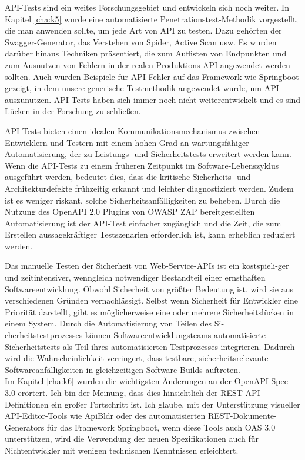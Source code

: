 API-Tests sind ein weites Forschungsgebiet und entwickeln sich noch weiter. In Kapitel \ref{cha:k5} wurde eine automatisierte Penetrationstest-Methodik vorgestellt, die man anwenden sollte, um jede Art von API zu testen. Dazu gehörten der Swagger-Generator, das Verstehen von Spider, Active Scan usw. Es wurden darüber hinaus Techniken präsentiert, die zum Auflisten von Endpunkten und zum Ausnutzen von Fehlern in der realen Produktions-API angewendet werden sollten. Auch wurden Beispiele für API-Fehler auf das Framework wie Springboot gezeigt, in dem unsere generische Testmethodik angewendet wurde, um API auszunutzen. API-Tests haben sich immer noch nicht weiterentwickelt und es sind Lücken in der Forschung zu schließen.

API-Tests bieten einen idealen Kommunikationsmechanismus zwischen Entwicklern und Testern mit einem hohen Grad an wartungsfähiger Automatisierung, der zu Leistungs- und Sicherheitstests erweitert werden kann. Wenn die API-Tests zu einem früheren Zeitpunkt im Software-Lebenszyklus ausgeführt werden, bedeutet dies, dass die kritische Sicherheits- und Architekturdefekte frühzeitig erkannt und leichter diagnostiziert werden. Zudem ist es weniger riskant, solche Sicherheitsanfälligkeiten zu beheben. Durch die Nutzung des OpenAPI 2.0 Plugins von OWASP ZAP bereitgestellten Automatisierung ist der API-Test einfacher zugänglich und die Zeit, die zum Erstellen aussagekräftiger Testszenarien erforderlich ist, kann erheblich reduziert werden.

Das manuelle Testen der Sicherheit von Web-Service-APIs ist ein kostspieli-ger und zeitintensiver, wenngleich notwendiger Bestandteil einer ernsthaften Softwareentwicklung. Obwohl Sicherheit von größter Bedeutung ist, wird sie aus verschiedenen Gründen vernachlässigt. Selbst wenn Sicherheit für Entwickler eine Priorität darstellt, gibt es möglicherweise eine oder mehrere Sicherheitslücken in einem System. Durch die Automatisierung von Teilen des Si-cherheitstestprozesses können Softwareentwicklungsteams automatisierte Sicherheitstests als Teil ihres automatisierten Testprozesses integrieren. Dadurch wird die Wahrscheinlichkeit verringert, dass testbare, sicherheitsrelevante Softwareanfälligkeiten in gleichzeitigen Software-Builds auftreten.\\


Im Kapitel \ref{cha:k6} wurden die wichtigsten Änderungen an der OpenAPI Spec 3.0 erörtert. Ich bin der Meinung, dass dies hinsichtlich der REST-API-Definitionen ein großer Fortschritt ist. Ich glaube, mit der Unterstützung visueller API-Editor-Tools wie ApiBldr oder des automatisierten REST-Dokumente-Generators für das Framework Springboot, wenn diese Tools auch OAS 3.0 unterstützen, wird die Verwendung der neuen Spezifikationen auch für Nichtentwickler mit wenigen technischen Kenntnissen erleichtert.


